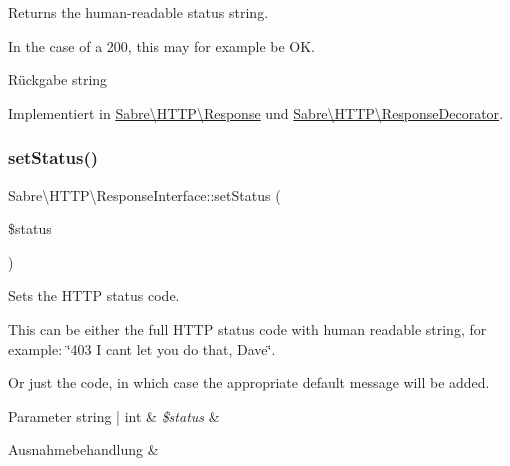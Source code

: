 Returns the human-\/readable status string.

In the case of a 200, this may for example be \textquotesingle{}OK\textquotesingle{}.

\begin{DoxyReturn}{Rückgabe}
string 
\end{DoxyReturn}


Implementiert in \mbox{\hyperlink{class_sabre_1_1_h_t_t_p_1_1_response_af303e7bec58ea83086d1b7fe6cd7060d}{Sabre\textbackslash{}\+H\+T\+T\+P\textbackslash{}\+Response}} und \mbox{\hyperlink{class_sabre_1_1_h_t_t_p_1_1_response_decorator_a74d8862eeb17eeba7777ba54e0456918}{Sabre\textbackslash{}\+H\+T\+T\+P\textbackslash{}\+Response\+Decorator}}.

\mbox{\label{interface_sabre_1_1_h_t_t_p_1_1_response_interface_a918855cfff846d31ac733011952839c8}} 
\subsubsection{\texorpdfstring{set\+Status()}{setStatus()}}
{\footnotesize\ttfamily Sabre\textbackslash{}\+H\+T\+T\+P\textbackslash{}\+Response\+Interface\+::set\+Status (\begin{DoxyParamCaption}\item[{}]{\$status }\end{DoxyParamCaption})}

Sets the H\+T\+TP status code.

This can be either the full H\+T\+TP status code with human readable string, for example\+: \char`\"{}403 I can\textquotesingle{}t let you do that, Dave\char`\"{}.

Or just the code, in which case the appropriate default message will be added.


\begin{DoxyParams}[1]{Parameter}
string | int & {\em \$status} & \\
\hline
\end{DoxyParams}

\begin{DoxyExceptions}{Ausnahmebehandlung}
{\em } & \\
\hline
\end{DoxyExceptions}


